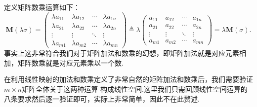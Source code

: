 定义矩阵数乘运算如下：
\[\mathbf{M}(\lambda\sigma)=\begin{pmatrix}
    \lambda a_{11} & \lambda a_{12} & \cdots & \lambda a_{1n} \\
    \lambda a_{21} & \lambda a_{22} & \cdots & \lambda a_{2n} \\
    \vdots & \vdots & \ddots & \vdots \\
    \lambda a_{m1} & \lambda a_{m2} & \cdots & \lambda a_{mn}
\end{pmatrix}\triangleq\lambda\begin{pmatrix}
    a_{11} & a_{12} & \cdots & a_{1n} \\
    a_{21} & a_{22} & \cdots & a_{2n} \\
    \vdots & \vdots & \ddots & \vdots \\
    a_{m1} & a_{m2} & \cdots & a_{mn}
\end{pmatrix}=\lambda\mathbf{M}(\sigma).\]
事实上这非常符合我们对于矩阵加法和数乘的幻想，即矩阵加法就是对应元素相加，矩阵数乘就是对应元素乘以一个数.

在利用线性映射的加法和数乘定义了非常自然的矩阵加法和数乘后，我们需要验证$m\times n$矩阵全体关于这两种运算
构成线性空间.这里我们只需回顾线性空间运算的八条要求然后逐一验证即可，实际上非常简单，因此不在此赘述.

